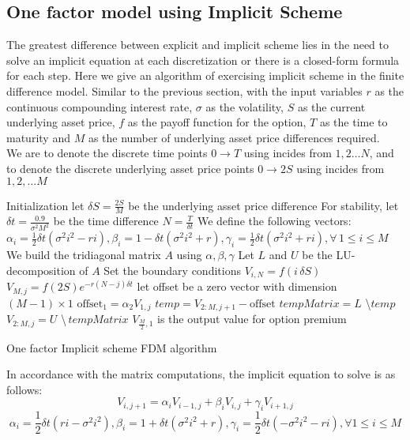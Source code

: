 \subsection{One factor model using Implicit Scheme}
The greatest difference between explicit and implicit scheme lies in the need to solve an implicit equation at each discretization or there is a closed-form formula for each step.
Here we give an algorithm of exercising implicit scheme in the finite difference model. Similar to the previous section, with the input variables $r$ as the continuous compounding interest rate, $\sigma$ as the volatility, $S$ as the current underlying asset price, $f$ as the payoff function for the option, $T$ as the time to maturity and $M$ as the number of underlying asset price differences required.\\
We are to denote the discrete time points $0 \to T$ using incides from $1,2 \dots N$, and to denote the discrete underlying asset price points $0 \to 2S$ using incides from $1,2, \dots M$\\[2mm]
\begin{algorithm}[H]
 Initialization\;
 let $\delta S = \frac{2S}{M}$ be the underlying asset price difference \;
 For stability, let $\delta t = \frac{0.9}{\sigma^{2}M^{2}}$ be the time difference\;
 $N = \frac{T}{\delta t}$\;
 We define the following vectors:\\
 $\alpha_{i} = \frac{1}{2}\delta t(\sigma^{2}i^{2} - ri), \beta_{i} = 1-\delta t(\sigma^{2}i^{2} + r), \gamma_{i} = \frac{1}{2}\delta t(\sigma^{2}i^{2} + ri), \forall \, 1 \le i \le M$\;
 We build the tridiagonal matrix $A$ using $\alpha, \beta, \gamma$\;
 Let $L$ and $U$ be the LU-decomposition of $A$\;
 Set the boundary conditions\;
  {
  $V_{i, N} = f(i\,\delta S)$\;
 }
  {
  $V_{M, j} = f(2S)e^{-r(N-j)\delta t}$\;
 }
 let offset be a zero vector with dimension $(M-1) \times 1$\;
  {
  $\text{offset}_{1} = \alpha_{2} V_{1, j}$\;
  $temp =  V_{2:M, j+1} - \text{offset}$\;
  $tempMatrix =  L$ \textbackslash $temp$\;
  $V_{2:M, j} = U$ \textbackslash $\,tempMatrix$\;
 }
 $V_{\frac{M}{2},1}$ is the output value for option premium\;
\caption{One factor Implicit scheme FDM algorithm}
\end{algorithm}
In accordance with the matrix computations, the implicit equation to solve is as follows:
$$V_{i, j+1} = \alpha_{i}V_{i-1,j} + \beta_{i}V_{i,j} + \gamma_{i}V_{i+1,j}$$
$$\alpha_{i} = \frac{1}{2}\delta t(ri-\sigma^{2}i^{2}), \beta_{i} = 1+\delta t(\sigma^{2}i^{2} + r), \gamma_{i} = \frac{1}{2}\delta t(-\sigma^{2}i^{2} - ri), \forall 1 \le i \le M$$
\newpage
